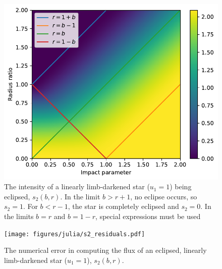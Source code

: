 \documentclass[modern]{aastex61}
\begin{document}
\begin{figure}\label{transit_linear}
    \begin{centering}
    \includegraphics[width=0.85\linewidth]{figures/julia/transit_linear.pdf}
    \caption{The intensity of a linearly limb-darkened star ($u_1=1$) being
    eclipsed, $s_2(b,r)$.
    In the limit $b > r+1$, no eclipse occurs, so $s_2=1$.  For $b < r-1$, the star
    is completely eclipsed and $s_2=0$.  In the limits $b=r$ and $b=1-r$, special
    expressions must be used}
    \end{centering}
\end{figure}

\begin{figure}\label{s2_plot}
    \begin{centering}
    \texttt{[image: figures/julia/s2\_residuals.pdf]}
    \caption{The numerical error in computing the flux of an eclipsed,  linearly
    limb-darkened star ($u_1=1$), $s_2(b,r)$.}
    \end{centering}
\end{figure}
\end{document}
